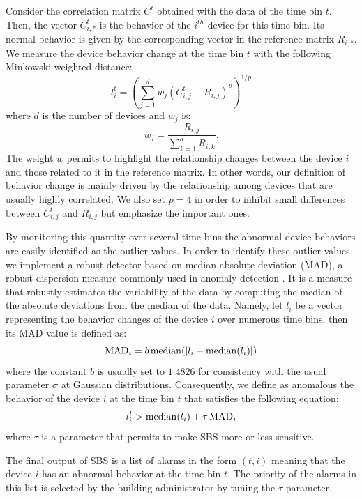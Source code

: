 Consider the correlation matrix $C^t$ obtained with the data of the time bin $t$.
Then, the vector $C^t_{i,*}$ is the behavior of the $i^{th}$ device for this time bin.
Its normal behavior is given by the corresponding vector in the reference matrix $R_{i,*}$.
We measure the device behavior change at the time bin $t$ with the following Minkowski weighted distance:
\[ l^t_{i} = \left(\sum_{j=1}^d  w_j\left(C^t_{i,j} - R_{i,j}\right)^p\right)^{1/p} \]
where $d$ is the number of devices and $w_j$ is:
\[ w_j = \frac{R_{i,j}}{\sum_{k=1}^d R_{i,k}}. \]
The weight $w$ permits to highlight the relationship changes between the device $i$ and those related to it in the reference matrix.
In other words, our definition of behavior change is mainly driven by the relationship among devices that are usually highly correlated.
We also set $p=4$ in order to inhibit small differences between $C^t_{i,j}$ and $R_{i,j}$ but emphasize the important ones.

By monitoring this quantity over several time bins the abnormal device behaviors are easily identified as the outlier values.
In order to identify these outlier values we implement a robust detector based on median absolute deviation (MAD), a robust dispersion measure commonly used in anomaly detection \cite{huber:wiley2009,chan:springer2005}.
It is a measure that robustly estimates the variability of the data by computing the median of the absolute deviations from the median of the data.
Namely, let $l_{i}$ be a vector representing the behavior changes of the device $i$ over numerous time bins, then its MAD value is defined as:
\[ \operatorname{MAD}_i = b \operatorname{median}(\lvert l_{i} - \operatorname{median}(l_{i})\rvert)\]
where the constant $b$ is usually set to $1.4826$ for consistency with the usual parameter $\sigma$ at Gaussian distributions.
Consequently, we define as anomalous the behavior of the device $i$ at the time bin $t$ that satisfies the following equation:
\[l^t_{i} > \operatorname{median}(l_{i}) + \tau  \operatorname{MAD}_i\]
where $\tau$ is a parameter that permits to make SBS more or less sensitive.

The final output of SBS is a list of alarms in the form $(t,i)$ meaning that the device $i$ has an abnormal behavior at the time bin $t$.
The priority of the alarms in this list is selected by the building administrator by tuning the $\tau$ parameter.
